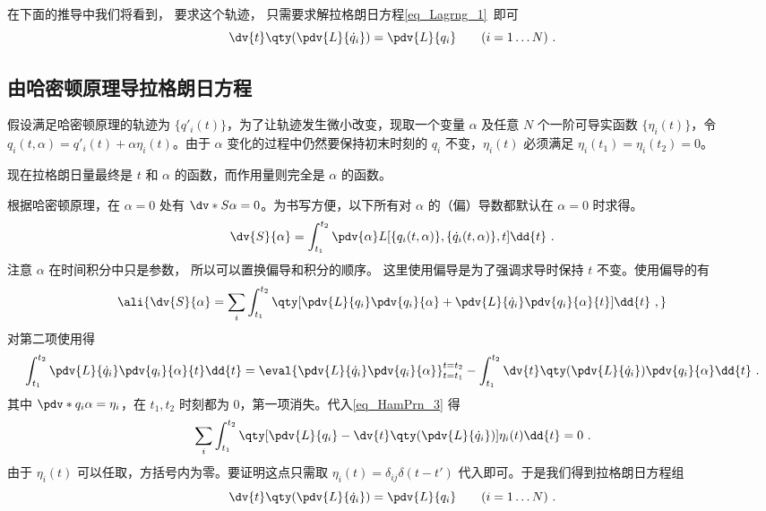 在下面的推导中我们将看到， 要求这个轨迹， 只需要求解拉格朗日方程\autoref{eq_Lagrng_1}~即可
\begin{equation}\label{eq_HamPrn_4}
\dv{t} \qty(\pdv{L}{\dot q_i}) = \pdv{L}{q_i} \qquad
(i = 1\dots N)~.
\end{equation}

\subsection{由哈密顿原理导拉格朗日方程}

假设满足哈密顿原理的轨迹为 $\{q'_i(t)\}$，为了让轨迹发生微小改变，现取一个变量 $\alpha$ 及任意 $N$ 个一阶可导实函数 $\{\eta_i(t)\}$，令 $q_i(t,\alpha ) = q'_i(t) + \alpha \eta_i(t)$。由于 $\alpha$ 变化的过程中仍然要保持初末时刻的 $q_i$ 不变，$\eta_i(t)$ 必须满足 $\eta_i(t_1) = \eta_i(t_2) = 0$。

现在拉格朗日量最终是 $t$ 和 $\alpha$ 的函数，而作用量则完全是 $\alpha$ 的函数。
 
根据哈密顿原理，在 $\alpha = 0$ 处有 $\dv*{S}{\alpha} = 0$。为书写方便，以下所有对 $\alpha$ 的（偏）导数都默认在 $\alpha=0$ 时求得。
\begin{equation}
\dv{S}{\alpha} = \int_{t_1}^{t_2} \pdv{\alpha} L[\{q_i(t,\alpha )\}, \{\dot q_i(t,\alpha)\}, t] \dd{t}~.
\end{equation}
注意 $\alpha$ 在时间积分中只是参数， 所以可以置换偏导和积分的顺序。 %
这里使用偏导是为了强调求导时保持 $t$ 不变。使用偏导的有
\begin{equation}\label{eq_HamPrn_3}
\ali{
\dv{S}{\alpha} =
\sum_i \int_{t_1}^{t_2} \qty[\pdv{L}{q_i} \pdv{q_i}{\alpha} + \pdv{L}{\dot q_i}\pdv{q_i}{\alpha}{t}] \dd{t}~,
}\end{equation}
对第二项使用得
\begin{equation}
\int_{t_1}^{t_2} \pdv{L}{\dot q_i} \pdv{q_i}{\alpha}{t} \dd{t}  = \eval{\pdv{L}{\dot q_i}\pdv{q_i}{\alpha}}_{t = t_1}^{t = t_2} - \int_{t_1}^{t_2} \dv{t} \qty(\pdv{L}{\dot q_i})\pdv{q_i}{\alpha} \dd{t}~.
\end{equation}
其中 $\pdv*{q_i}{\alpha}  = \eta_i$，在 $t_1, t_2$ 时刻都为 0，第一项消失。代入\autoref{eq_HamPrn_3} 得
\begin{equation}
\sum_i \int_{t_1}^{t_2} \qty[\pdv{L}{q_i} - \dv{t} \qty(\pdv{L}{\dot q_i})] \eta_i(t) \dd{t} = 0~.
\end{equation}
由于 $\eta_i(t)$ 可以任取，方括号内为零。要证明这点只需取 $\eta_i(t) = \delta_{ij}\delta(t - t')$ 代入即可。于是我们得到拉格朗日方程组
\begin{equation}\label{eq_HamPrn_2}
\dv{t} \qty(\pdv{L}{\dot q_i}) = \pdv{L}{q_i} \qquad
(i = 1\dots N)~.
\end{equation}
